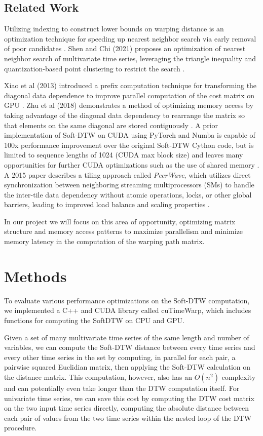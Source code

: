 \documentclass[12pt, letterpaper]{article}
\begin{document}
\subsection{Related Work}

Utilizing indexing to construct lower bounds on warping distance is an
optimization technique for speeding up nearest neighbor search via early removal
of poor candidates \cite{keogh_exact_2002}. Shen and Chi (2021) proposes an
optimization of nearest neighbor search of multivariate time series, leveraging
the triangle inequality and quantization-based point clustering to restrict the
search \cite{shen_tc-dtw_2021}.

Xiao et al (2013) introduced a prefix computation technique for transforming the
diagonal data dependence to improve parallel computation of the cost matrix on
GPU \cite{xiao_parallelizing_2013}. Zhu et al (2018) demonstrates a method of
optimizing  memory access by taking advantage of the diagonal data dependency to
rearrange the matrix so that elements on the same diagonal are stored
contiguously \cite{zhu_developing_2018}. A prior implementation of Soft-DTW on
CUDA using PyTorch and Numba is capable of 100x performance improvement over the
original Soft-DTW Cython code, but is limited to sequence lengths of 1024 (CUDA
max block size) and leaves many opportunities for further CUDA optimizations
such as the use of shared memory \cite{maghoumi_pytorch-softdtw-cuda_2021}. A
2015 paper describes a tiling approach called \emph{PeerWave}, which utilizes
direct synchronization between neighboring streaming multiprocessors (SMs) to
handle the inter-tile data dependency without atomic operations, locks, or other
global barriers, leading to improved load balance and scaling properties
\cite{belviranli_peerwave_2015}.

In our project we will focus on this area of opportunity, optimizing matrix
structure and memory access patterns to maximize parallelism and minimize memory
latency in the computation of the warping path matrix.

\section{Methods}

To evaluate various performance optimizations on the Soft-DTW computation, we
implemented a C++ and CUDA library called cuTimeWarp, which includes functions
for computing the SoftDTW on CPU and GPU.

Given a set of many multivariate time series of the same length and number of
variables, we can compute the Soft-DTW distance between every time series and
every other time series in the set by computing, in parallel for each pair, a
pairwise squared Euclidian matrix, then applying the Soft-DTW calculation on the
distance matrix. This computation, however, also has an $O(n^2)$ complexity and
can potentially even take longer than the DTW computation itself. For univariate
time series, we can save this cost by computing the DTW cost matrix on the two
input time series directly, computing the absolute distance between each pair of
values from the two time series within the nested loop of the DTW procedure.
\end{document}
